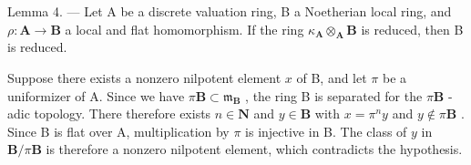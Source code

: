 Lemma 4. — Let A be a discrete valuation ring, B a Noetherian local ring, and \(\rho: \mathbf{A} \to \mathbf{B}\) a local and flat homomorphism. If the ring \(\kappa_{\mathbf{A}} \otimes_{\mathbf{A}} \mathbf{B}\) is reduced, then B is reduced.

Suppose there exists a nonzero nilpotent element \(x\) of B, and let \(\pi\) be a uniformizer of A. Since we have \(\pi \mathbf{B} \subset \mathfrak{m}_{\mathbf{B}}\) , the ring B is separated for the \(\pi \mathbf{B}\) -adic topology. There therefore exists \(n \in \mathbf{N}\) and \(y \in \mathbf{B}\) with \(x = \pi^n y\) and \(y \notin \pi \mathbf{B}\) . Since B is flat over A, multiplication by \(\pi\) is injective in B. The class of \(y\) in \(\mathbf{B}/\pi \mathbf{B}\) is therefore a nonzero nilpotent element, which contradicts the hypothesis.
\relax{}
